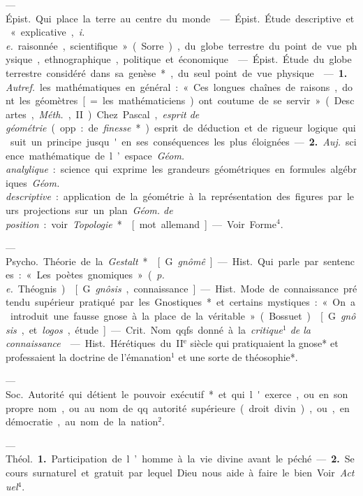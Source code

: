 \begin{itemize}[leftmargin=1cm, label=, itemsep=1pt]
 — \si{Épist.} Qui place la terre au centre du monde.

 — \si{Épist.} Étude descriptive et « explicative, {\it i. e.}
raisonnée, scientifique » (Sorre), du globe terrestre du point de vue
physique, ethnographique, politique et économique.

 — \si{Épist.} Étude du globe terrestre considéré dans sa
genèse*, du seul point de vue physique.

 — {\bf 1.} {\it Autref.} les mathématiques en général : « Ces
longues chaînes de raisons, dont les géomètres [= les mathématiciens) ont
coutume de se servir » (Descartes, {\it Méth.}, II). Chez Pascal,
{\it esprit de géométrie} (opp. : de {\it finesse}*) esprit de déduction et
de rigueur logique qui suit un principe jusqu'en ses conséquences les plus
éloignées. — {\bf 2.} {\it Auj.} science mathématique de l’espace.
{\it Géom. analylique} : science qui exprime les grandeurs géométriques en
formules algébriques. {\it Géom. descriptive} : application de la géométrie à
la représentation des figures par leurs projections sur un plan.
{\it Géom. de position} : voir {\it Topologie}*.

 [mot allemand]. — Voir Forme$^4$.

 — \si{Psycho.} Théorie de la {\it Gestalt}*.

 [G. {\it gnômê}]. — \si{Hist.} Qui parle par sentences : « Les
poètes gnomiques » ({\it p. e.} Théognis).

 [G. {\it gnôsis}, connaissance]. — \si{Hist.} Mode de connaissance
prétendu supérieur pratiqué par les Gnostiques* et certains mystiques : « On
a introduit une fausse gnose à la place de la véritable » (Bossuet).

 [G. {\it gnôsis}, et {\it logos}, étude].
— \si{Crit.} Nom qqfs. donné à la {\it critique$^1$ de la connaissance}.

 — \si{Hist.} Hérétiques du
{\footnotesize II}$^\text{e}$ siècle qui pratiquaient la gnose*
et professaient la doctrine de l’émanation$^1$ et une sorte de théosophie*.

 — \si{Soc.} Autorité qui détient le pouvoir exécutif* et
qui l'exerce, ou en son propre nom, ou au nom de qq. autorité supérieure
(droit divin), ou, en démocratie, au nom de la nation$^2$.

 — \si{Théol.} {\bf 1.} Participation de l’homme à la vie divine
avant le péché. — {\bf 2.} Secours surnaturel et gratuit par lequel Dieu nous
aide à faire le bien. Voir {\it Actuel}$^4$.


\end{itemize}
